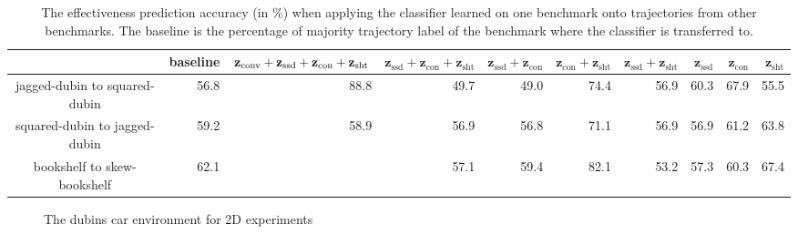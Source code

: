 \documentclass[letterpaper, 10 pt, conference]{ieeeconf}  %
\newcommand{\fssd}{\mbox{$\mathbf z_{\text{ssd}}$}}
\newcommand{\fcon}{\mbox{$\mathbf z_{\text{con}}$}}
\newcommand{\fsht}{\mbox{$\mathbf z_{\text{sht}}$}}
\begin{document}
\begin{table}[tbp]
\centering
\begin{tabular}{|c|r|r|r|r|r|r|r|r|r|}
\hline 
 & baseline &  ${\bf z}_\textrm{conv} +\fssd+\fcon+\fsht$ & $\fssd+\fcon+\fsht$ & $\fssd+\fcon$ & $\fcon+\fsht$ & $\fssd+\fsht$ & $\fssd$ & $\fcon$ & $\fsht$ \\ \hline \hline
jagged-dubin to squared-dubin &  56.8 & 88.8 & 49.7 & 49.0 &	74.4 & 	56.9 & 	60.3	 & 67.9	& 55.5
 \\ \hline
squared-dubin to jagged-dubin & 59.2 & 58.9 & 56.9 &	56.8 &	71.1 & 	56.9 &	56.9 &	61.2 &	63.8 \\ \hline
bookshelf to skew-bookshelf & 62.1 & & 57.1 &	59.4 &	82.1 & 	53.2 &	57.3 &	60.3 &	67.4 \\ \hline
\end{tabular}
\caption{The effectiveness prediction accuracy (in \%) when applying the classifier learned on one benchmark onto trajectories from other benchmarks. The baseline is the percentage of majority trajectory label of the benchmark where the classifier is transferred to.}
\label{tab:result2}
\end{table}



\begin{figure}[t]
\centering
{}
\caption{The dubins car environment for 2D experiments}
\label{fig:benchmarks1}
\end{figure}
\end{document}

